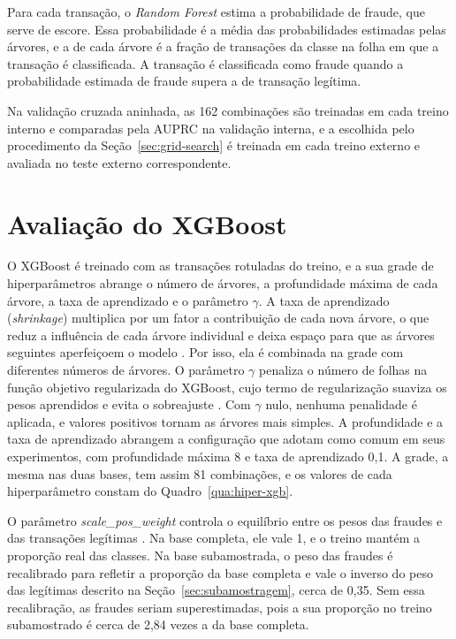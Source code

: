 \documentclass{uflamon}          %
\begin{document}
Para cada transação, o \textit{Random Forest} estima a probabilidade de fraude, que serve de escore. Essa probabilidade é a média das probabilidades estimadas pelas árvores, e a de cada árvore é a fração de transações da classe na folha em que a transação é classificada. A transação é classificada como fraude quando a probabilidade estimada de fraude supera a de transação legítima.

Na validação cruzada aninhada, as 162 combinações são treinadas em cada treino interno e comparadas pela AUPRC na validação interna, e a escolhida pelo procedimento da Seção~\ref{sec:grid-search} é treinada em cada treino externo e avaliada no teste externo correspondente.

\section{Avaliação do XGBoost}
\label{sec:avaliacao-xgb}

O XGBoost é treinado com as transações rotuladas do treino, e a sua grade de hiperparâmetros abrange o número de árvores, a profundidade máxima de cada árvore, a taxa de aprendizado e o parâmetro $\gamma$. A taxa de aprendizado (\textit{shrinkage}) multiplica por um fator a contribuição de cada nova árvore, o que reduz a influência de cada árvore individual e deixa espaço para que as árvores seguintes aperfeiçoem o modelo \cite{chen2016}. Por isso, ela é combinada na grade com diferentes números de árvores. O parâmetro $\gamma$ penaliza o número de folhas na função objetivo regularizada do XGBoost, cujo termo de regularização suaviza os pesos aprendidos e evita o sobreajuste \cite{chen2016}. Com $\gamma$ nulo, nenhuma penalidade é aplicada, e valores positivos tornam as árvores mais simples. A profundidade e a taxa de aprendizado abrangem a configuração que  adotam como comum em seus experimentos, com profundidade máxima 8 e taxa de aprendizado 0,1. A grade, a mesma nas duas bases, tem assim 81 combinações, e os valores de cada hiperparâmetro constam do Quadro~\ref{qua:hiper-xgb}.

O parâmetro \textit{scale\_pos\_weight} controla o equilíbrio entre os pesos das fraudes e das transações legítimas \cite{xgboost2026}. Na base completa, ele vale 1, e o treino mantém a proporção real das classes. Na base subamostrada, o peso das fraudes é recalibrado para refletir a proporção da base completa e vale o inverso do peso das legítimas descrito na Seção~\ref{sec:subamostragem}, cerca de 0,35. Sem essa recalibração, as fraudes seriam superestimadas, pois a sua proporção no treino subamostrado é cerca de 2,84 vezes a da base completa.
\end{document}
